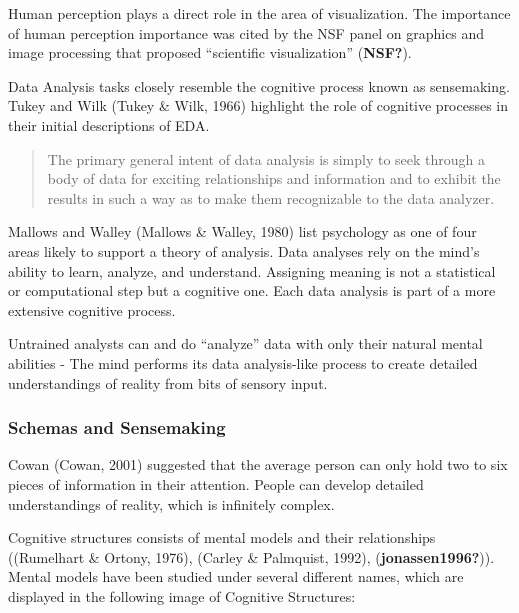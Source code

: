 \documentclass[print]{nuthesis}
\begin{document}
Human perception plays a direct role in the area of visualization. The importance of human perception importance was cited by the NSF panel on graphics and image processing that proposed ``scientific visualization'' (\textbf{NSF?}).

Data Analysis tasks closely resemble the cognitive process known as sensemaking. Tukey and Wilk (Tukey \& Wilk, 1966) highlight the role of cognitive processes in their initial descriptions of EDA.

\begin{quote}
The primary general intent of data analysis is simply to seek through a body of data for exciting relationships and information and to exhibit the results in such a way as to make them recognizable to the data analyzer.
\end{quote}

Mallows and Walley (Mallows \& Walley, 1980) list psychology as one of four areas likely to support a theory of analysis. Data analyses rely on the mind's ability to learn, analyze, and understand. Assigning meaning is not a statistical or computational step but a cognitive one. Each data analysis is part of a more extensive cognitive process.

Untrained analysts can and do ``analyze'' data with only their natural mental abilities
- The mind performs its data analysis-like process to create detailed understandings of reality from bits of sensory input.

\hypertarget{schemas-and-sensemaking}{%
\subsubsection{Schemas and Sensemaking}\label{schemas-and-sensemaking}}

Cowan (Cowan, 2001) suggested that the average person can only hold two to six pieces of information in their attention. People can develop detailed understandings of reality, which is infinitely complex.

Cognitive structures consists of mental models and their relationships ((Rumelhart \& Ortony, 1976), (Carley \& Palmquist, 1992), (\textbf{jonassen1996?})). Mental models have been studied under several different names, which are displayed in the following image of Cognitive Structures:
\end{document}
